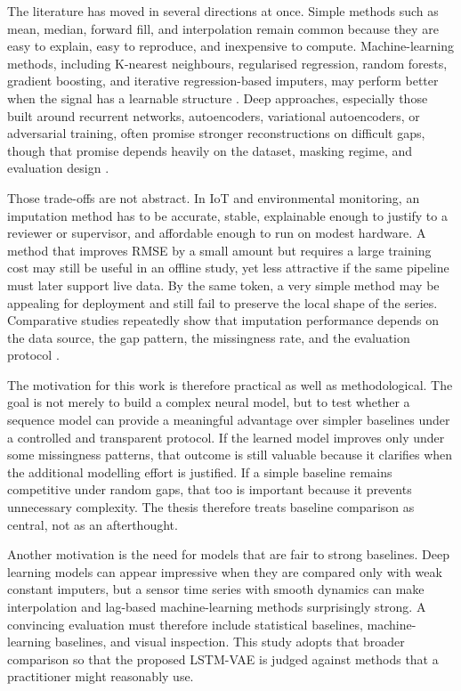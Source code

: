 The literature has moved in several directions at once. Simple methods such as mean, median, forward fill, and interpolation remain common because they are easy to explain, easy to reproduce, and inexpensive to compute. Machine-learning methods, including K-nearest neighbours, regularised regression, random forests, gradient boosting, and iterative regression-based imputers, may perform better when the signal has a learnable structure \cite{Raj2023MachineLB,Erhan2021CriticalCO,Lee2025ComparisonOM}. Deep approaches, especially those built around recurrent networks, autoencoders, variational autoencoders, or adversarial training, often promise stronger reconstructions on difficult gaps, though that promise depends heavily on the dataset, masking regime, and evaluation design \cite{Yoon2018GAINMD,Wang2024MissingDI,Shahbazian2023GenerativeAN,Okafor2021}.

Those trade-offs are not abstract. In IoT and environmental monitoring, an imputation method has to be accurate, stable, explainable enough to justify to a reviewer or supervisor, and affordable enough to run on modest hardware. A method that improves RMSE by a small amount but requires a large training cost may still be useful in an offline study, yet less attractive if the same pipeline must later support live data. By the same token, a very simple method may be appealing for deployment and still fail to preserve the local shape of the series. Comparative studies repeatedly show that imputation performance depends on the data source, the gap pattern, the missingness rate, and the evaluation protocol \cite{Koshta2021ACO,Farjallah2025EvaluationOM,Toye2025BenchmarkingMD}.

The motivation for this work is therefore practical as well as methodological. The goal is not merely to build a complex neural model, but to test whether a sequence model can provide a meaningful advantage over simpler baselines under a controlled and transparent protocol. If the learned model improves only under some missingness patterns, that outcome is still valuable because it clarifies when the additional modelling effort is justified. If a simple baseline remains competitive under random gaps, that too is important because it prevents unnecessary complexity. The thesis therefore treats baseline comparison as central, not as an afterthought.

Another motivation is the need for models that are fair to strong baselines. Deep learning models can appear impressive when they are compared only with weak constant imputers, but a sensor time series with smooth dynamics can make interpolation and lag-based machine-learning methods surprisingly strong. A convincing evaluation must therefore include statistical baselines, machine-learning baselines, and visual inspection. This study adopts that broader comparison so that the proposed LSTM-VAE is judged against methods that a practitioner might reasonably use.

